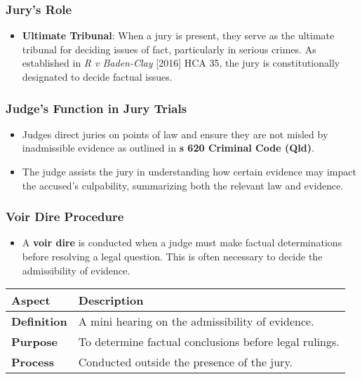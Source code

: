 \subsubsection{Jury's Role}\label{jurys-role}

\begin{itemize}
\tightlist
\item
  \textbf{Ultimate Tribunal}: When a jury is present, they serve as the
  ultimate tribunal for deciding issues of fact, particularly in serious
  crimes. As established in \emph{R v Baden-Clay} {[}2016{]} HCA 35, the
  jury is constitutionally designated to decide factual issues.
\end{itemize}

\subsubsection{Judge's Function in Jury
Trials}\label{judges-function-in-jury-trials}

\begin{itemize}
\tightlist
\item
  Judges direct juries on points of law and ensure they are not misled
  by inadmissible evidence as outlined in \textbf{s 620 Criminal Code
  (Qld)}.
\item
  The judge assists the jury in understanding how certain evidence may
  impact the accused's culpability, summarizing both the relevant law
  and evidence.
\end{itemize}

\subsubsection{Voir Dire Procedure}\label{voir-dire-procedure}

\begin{itemize}
\tightlist
\item
  A \textbf{voir dire} is conducted when a judge must make factual
  determinations before resolving a legal question. This is often
  necessary to decide the admissibility of evidence.
\end{itemize}

\begin{longtable}[]{@{}
  >{\raggedright\arraybackslash}p{}
  >{\raggedright\arraybackslash}p{}@{}}
\toprule\noalign{}
\begin{minipage}[b]{\linewidth}\raggedright
Aspect
\end{minipage} & \begin{minipage}[b]{\linewidth}\raggedright
Description
\end{minipage} \\
\midrule\noalign{}
\endhead
\bottomrule\noalign{}
\endlastfoot
\textbf{Definition} & A mini hearing on the admissibility of
evidence. \\
\textbf{Purpose} & To determine factual conclusions before legal
rulings. \\
\textbf{Process} & Conducted outside the presence of the jury. \\
\end{longtable}

